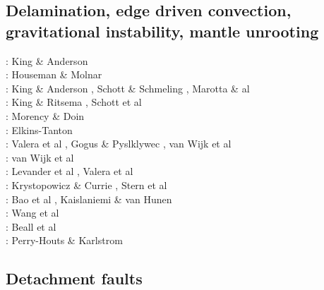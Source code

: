 \subsection{Delamination, edge driven convection, gravitational instability, mantle unrooting} 

\begin{scriptsize}
\nineteenninetyfive: King \& Anderson \cite{kian95}\\
\nineteenninetyseven: Houseman \& Molnar \cite{homo97}\\
\nineteenninetyeight: King \& Anderson \cite{kian98}, Schott \& Schmeling \cite{scsc98}, 
Marotta \& al \cite{mafs98}\\
\twothousand: King \& Ritsema \cite{kiri00}, Schott et al \cite{scys00}\\
\twothousandfour: Morency \& Doin \cite{modo04}\\
\twothousandseven: Elkins-Tanton \cite{elki07}\\
\twothousandeight: Valera et al \cite{vanv08}, Gogus \& Pyslklywec \cite{gopy08}, 
van Wijk et al \cite{vavg08}\\
\twothousandten: van Wijk et al \cite{vabv10}\\
\twothousandeleven: Levander et al \cite{lesm11}, Valera et al \cite{vanj11}\\
\twothousandthirteen: Krystopowicz \& Currie \cite{krcu13}, Stern et al \cite{sths13}\\
\twothousandfourteen: Bao et al \cite{baeg14}, Kaislaniemi \& van Hunen \cite{kava14}\\
\twothousandfifteen: Wang et al \cite{wahz15}\\
\twothousandseventeen: Beall et al \cite{bems17}\\
\twothousandeighteen: Perry-Houts \& Karlstrom \cite{peka18}
\end{scriptsize}


\subsection{Detachment faults} 

